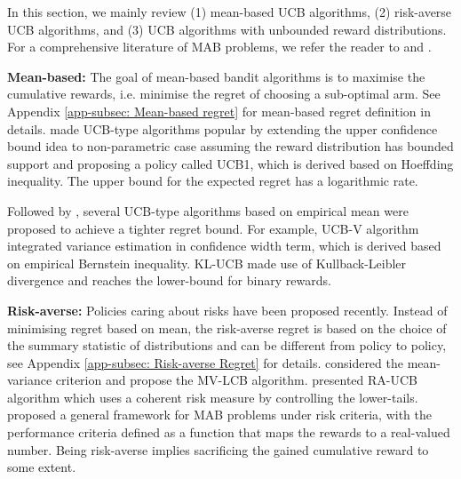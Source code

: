 In this section, we mainly review (1) mean-based UCB algorithms, (2) risk-averse UCB algorithms, and (3) UCB algorithms with unbounded reward distributions. For a comprehensive literature of MAB problems, we refer the reader to \textcite{bubeck_regret_2012} and \textcite{lattimore2018bandit}.


\textbf{Mean-based:}
The goal of mean-based bandit algorithms is to maximise the cumulative rewards, i.e. minimise the regret of choosing a sub-optimal arm. See Appendix \ref{app-subsec: Mean-based regret} for mean-based regret definition in details.
 \textcite{Auer2002} made UCB-type algorithms popular by extending the upper confidence bound idea to non-parametric case assuming the reward distribution has bounded support and proposing a policy called UCB1, which is derived based on Hoeffding inequality. The upper bound for the expected regret has a logarithmic rate.

Followed by \textcite{Auer2002}, several UCB-type algorithms based on empirical mean were proposed to achieve a tighter regret bound.
For example, UCB-V algorithm \cite{audibert2009exploration} integrated variance estimation in confidence width term, which is derived based on empirical Bernstein inequality.
KL-UCB \cite{lai1985asymptotically} made use of Kullback-Leibler divergence and reaches the lower-bound for binary rewards.

\textbf{Risk-averse:} Policies caring about risks have been proposed recently.
Instead of minimising regret based on mean, the risk-averse regret is based on the choice of the summary statistic of distributions and can be different from policy to policy, see Appendix \ref{app-subsec: Risk-averse Regret} for details.
\textcite{sani_risk-aversion_2012} considered the mean-variance criterion and propose the MV-LCB algorithm.
\textcite{maillard_robust_2013} presented RA-UCB algorithm which uses a coherent risk measure by controlling the lower-tails. \textcite{cassel_general_2018} proposed a general framework for MAB problems under risk criteria, with the performance criteria defined as a function that maps the rewards to a real-valued number.
Being risk-averse implies sacrificing the gained cumulative reward to some extent.


